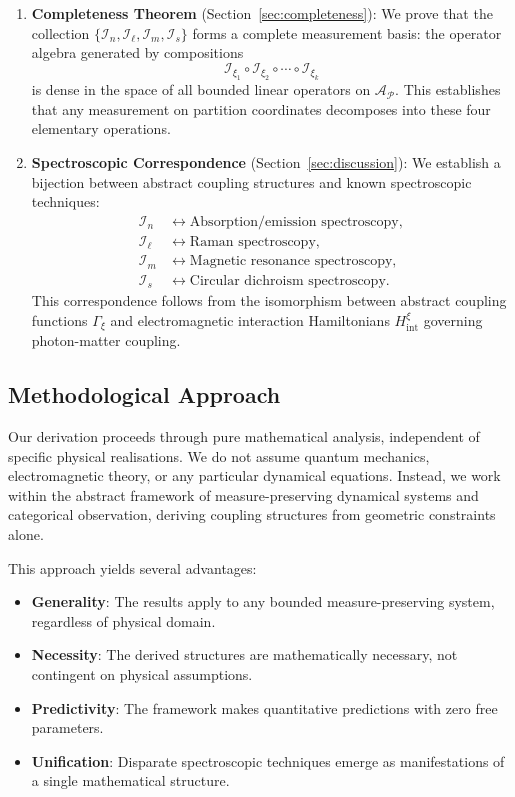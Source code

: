 \documentclass[twocolumn,10pt,a4paper]{article}
\theoremstyle{remark}
\newcommand{\partition}{\mathcal{P}}
\begin{document}
\begin{enumerate}
    \item \textbf{Completeness Theorem} (Section~\ref{sec:completeness}): We prove that the collection $\{\mathcal{I}_n, \mathcal{I}_\ell, \mathcal{I}_m, \mathcal{I}_s\}$ forms a complete measurement basis: the operator algebra generated by compositions
    \begin{equation}
    \mathcal{I}_{\xi_1} \circ \mathcal{I}_{\xi_2} \circ \cdots \circ \mathcal{I}_{\xi_k}
    \end{equation}
    is dense in the space of all bounded linear operators on $\mathcal{A}_\partition$. This establishes that any measurement on partition coordinates decomposes into these four elementary operations.
    
    \item \textbf{Spectroscopic Correspondence} (Section~\ref{sec:discussion}): We establish a bijection between abstract coupling structures and known spectroscopic techniques:
    \begin{align}
    \mathcal{I}_n &\longleftrightarrow \text{Absorption/emission spectroscopy}, \\
    \mathcal{I}_\ell &\longleftrightarrow \text{Raman spectroscopy}, \\
    \mathcal{I}_m &\longleftrightarrow \text{Magnetic resonance spectroscopy}, \\
    \mathcal{I}_s &\longleftrightarrow \text{Circular dichroism spectroscopy}.
    \end{align}
    This correspondence follows from the isomorphism between abstract coupling functions $\Gamma_\xi$ and electromagnetic interaction Hamiltonians $H_{\text{int}}^\xi$ governing photon-matter coupling.
\end{enumerate}

\subsection{Methodological Approach}

Our derivation proceeds through pure mathematical analysis, independent of specific physical realisations. We do not assume quantum mechanics, electromagnetic theory, or any particular dynamical equations. Instead, we work within the abstract framework of measure-preserving dynamical systems and categorical observation, deriving coupling structures from geometric constraints alone.

This approach yields several advantages:
\begin{itemize}
    \item \textbf{Generality}: The results apply to any bounded measure-preserving system, regardless of physical domain.
    \item \textbf{Necessity}: The derived structures are mathematically necessary, not contingent on physical assumptions.
    \item \textbf{Predictivity}: The framework makes quantitative predictions with zero free parameters.
    \item \textbf{Unification}: Disparate spectroscopic techniques emerge as manifestations of a single mathematical structure.
\end{itemize}
\end{document}
